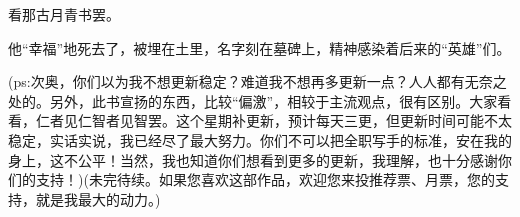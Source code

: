 \begin{this_body}
看那古月青书罢。

他“幸福”地死去了，被埋在土里，名字刻在墓碑上，精神感染着后来的“英雄”们。

(ps:次奥，你们以为我不想更新稳定？难道我不想再多更新一点？人人都有无奈之处的。另外，此书宣扬的东西，比较“偏激”，相较于主流观点，很有区别。大家看看，仁者见仁智者见智罢。这个星期补更新，预计每天三更，但更新时间可能不太稳定，实话实说，我已经尽了最大努力。你们不可以把全职写手的标准，安在我的身上，这不公平！当然，我也知道你们想看到更多的更新，我理解，也十分感谢你们的支持！)(未完待续。如果您喜欢这部作品，欢迎您来投推荐票、月票，您的支持，就是我最大的动力。)

\end{this_body}

